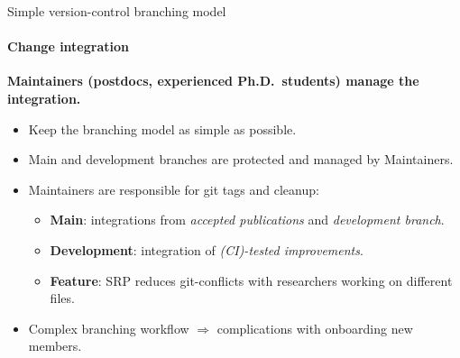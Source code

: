 \begin{frame}{Simple version-control branching model} 
    \framesubtitle{Change integration}

        \vfill

        \textbf{Maintainers (postdocs, experienced Ph.D.\ students) manage the integration.} 

	\begin{itemize}
            \item Keep the branching model as simple as possible.  
            \item Main and development branches are protected and managed by Maintainers. 
            \item Maintainers are responsible for git tags and cleanup: 
            \begin{itemize}
                    \item \textbf{Main}: integrations from \emph{accepted publications} and \emph{development branch}. 
                    \item \textbf{Development}: integration of \emph{(CI)-tested improvements}. 
                    \item \textbf{Feature}: SRP reduces git-conflicts with researchers working on different files.
            \end{itemize}
            \item Complex branching workflow $\Rightarrow$ complications with onboarding new members.
	\end{itemize}

\end{frame}
